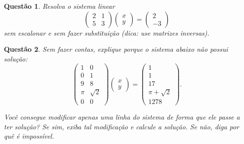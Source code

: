\documentclass[a4paper,12pt]{article}
\newtheorem{qst}{Questão}
\begin{document}
\begin{qst}
	Resolva o sistema linear
	\[\begin{pmatrix}
	2&1\\5&3
	\end{pmatrix}\begin{pmatrix}
	x\\y
	\end{pmatrix}=\begin{pmatrix}
	2\\-3
	\end{pmatrix}\]sem escalonar e sem fazer substituição (dica: use matrizes inversas).
\end{qst}
\begin{qst}
	Sem fazer contas, explique porque o sistema abaixo não possui solução:
	\[\begin{pmatrix}
		1&0\\0&1\\9&8\\\pi&\sqrt{2}\\0&0		
	\end{pmatrix}\begin{pmatrix}
	x\\y
\end{pmatrix}=\begin{pmatrix}
1\\1\\17\\\pi+\sqrt{2}\\1278
\end{pmatrix}.\]

Você consegue modificar apenas uma linha do sistema de forma que ele passe a ter solução? Se sim, exiba tal modificação e calcule a solução. Se não, diga por quê é impossível.
\end{qst}
\end{document}
